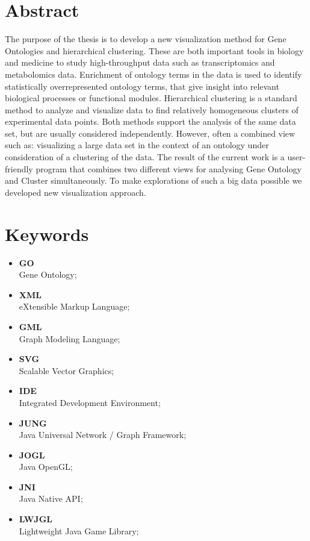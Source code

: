 \section*{Abstract}

The purpose of the thesis is to develop a new visualization method for Gene Ontologies and hierarchical clustering.
These are both important tools in biology and medicine to study high-throughput data such as transcriptomics and metabolomics data.
Enrichment of ontology terms in the data is used to identify statistically overrepresented ontology terms,
that give insight into relevant biological processes or functional modules.
Hierarchical clustering is a standard method to analyze and visualize data to find relatively homogeneous clusters of experimental data points.
Both methods support the analysis of the same data set, but are usually considered independently.
However, often a combined view such as: visualizing a large data set in the context of an ontology under consideration of a clustering of the data.
The result of the current work is a user-friendly program that combines two different views for analysing Gene Ontology and
Cluster simultaneously. To make explorations of such a big data possible we developed new visualization approach.

\section*{Keywords}
\label{sec:keywords}

\begin{itemize}
\item {\bf GO} \\ Gene Ontology;
\item {\bf XML} \\ eXtensible Markup Language;
\item {\bf GML} \\ Graph Modeling Language;
\item {\bf SVG} \\ Scalable Vector Graphics;
\item {\bf IDE} \\ Integrated Development Environment;
\item {\bf JUNG} \\ Java Universal Network / Graph Framework;
\item {\bf JOGL} \\ Java OpenGL;
\item {\bf JNI} \\ Java Native API;
\item {\bf LWJGL} \\ Lightweight Java Game Library;
\end{itemize}